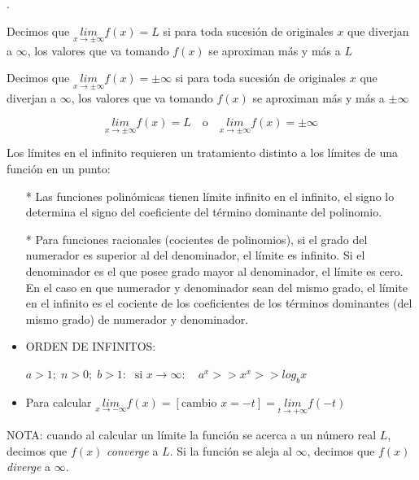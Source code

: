 	 \begin{defi}.
	 
	 Decimos que $\underset {x \to \pm \infty}{lim}{f(x)}= L$ si para toda sucesión de originales $x$ que diverjan a $\infty$, los valores que va tomando $f(x)$ se aproximan más y más a $L$
	 
	 Decimos que $\underset {x \to \pm \infty}{lim}{f(x)}= \pm \infty$ si para toda sucesión de originales $x$ que diverjan a $\infty$, los valores que va tomando $f(x)$ se aproximan más y más a $\pm \infty$
	 
	 \begin{equation}
	 	\underset {x\to \pm \infty}{lim}{f(x)}=L \quad \mbox{o} \quad \underset {x\to \pm \infty}{lim}{f(x)}=\pm \infty
	 \end{equation}

	 	
	 \end{defi}

	\vspace{2mm} Los límites en el infinito requieren un tratamiento distinto a los límites de una función en un punto:
	
	\begin{itemize}
		\item [*] Las funciones polinómicas tienen límite infinito en el infinito, el signo lo determina el signo del coeficiente del término dominante del polinomio.
		\item [*] Para funciones racionales (cocientes de polinomios), si el grado del numerador es superior al del denominador, el límite es infinito. Si el denominador es el que posee grado mayor al denominador, el límite es cero. En el caso en que numerador y denominador sean del mismo grado, el límite en el infinito es el cociente de los coeficientes de los términos dominantes (del mismo grado) de numerador y denominador.
		\item ORDEN DE INFINITOS: 
		
		\hspace{10mm} $a>1;\; n>0; \; b>1:\; \mbox{ si } x \to \infty: \quad a^x>>x^x>>log_bx$
		\item Para calcular $\underset {x \to -\infty}{lim}{f(x)} = [\mbox{cambio } x=-t] =\underset {t \to +\infty}{lim}{f(-t)}$
	\end{itemize}
	
	 NOTA: cuando al calcular un límite la función se acerca a un número real $L$, decimos que $f(x)$ \emph{converge} a $L$. Si la función se aleja al $\infty$, decimos que $f(x)$ \emph{diverge} a $\infty$.

